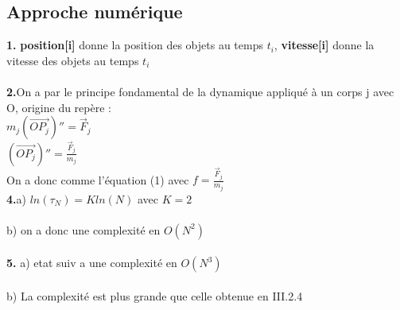 \documentclass{article}
\begin{document}
\subsection{Approche numérique}
{\bf 1.} {\bf position[i]} donne la position des objets au temps $t_i$, {\bf vitesse[i]} donne la vitesse des objets au temps $t_i$ \\
\\
{\bf 2.}On a par le principe fondamental de la dynamique appliqué à un corps j avec O, origine du repère : \\
$ m_j (\overrightarrow{OP_j})'' = \vec F_j $ \\
$(\overrightarrow{OP_j})'' =\frac{ \vec F_j}{m_j} $ \\
On a donc comme l'équation (1) avec $f=\frac{ \vec F_j}{m_j}$ \\


{\bf 4.}a) $ln(\tau_N)=Kln(N)$ avec $K=2$ \\
\\
b) on a donc une complexité en $O(N^2)$ \\
\\
{\bf 5.} a) etat suiv a une complexité en $O(N^3)$ \\
\\
b) La complexité est plus grande que celle obtenue en III.2.4 \\

\end{document}
